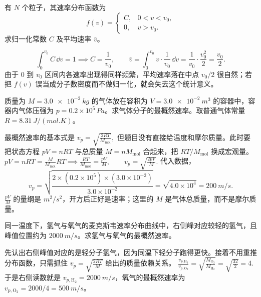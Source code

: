 \documentclass[lang=cn,11pt]{elegantbook}
\begin{document}
\begin{exercise}[分段常数分布函数怎样先归一化再求平均速率]
有 \(N\) 个粒子，其速率分布函数为
\[
f(v)=
\begin{cases}
C,&0<v<v_0,\\
0,&v>v_0.
\end{cases}
\]
求归一化常数 \(C\) 及平均速率 \(\bar v\)。
\end{exercise}
\begin{solution}
\[
\int_0^{v_0}C\,\dd v=1\implies C=\frac1{v_0},\qquad
\bar v=\int_0^{v_0} v\cdot \frac{1}{v_0}\,\dd v
=\frac{1}{v_0}\cdot \frac{v_0^2}{2}
=\frac{v_0}{2}.
\]
由于 \(0\) 到 \(v_0\) 区间内各速率出现得同样频繁，平均速率落在中点 \(v_0/2\) 很自然；若把 \(f(v)\) 误当成分子数密度而不做归一化，就会失去这个统计意义。
\end{solution}


\begin{exercise}
质量为 \(M=\SI{3.0e-2}{kg}\) 的气体放在容积为 \(V=\SI{3.0e-2}{m^3}\) 的容器中，容器内气体压强为 \(p=0.2\times10^5\,\si{Pa}\)。求气体分子的最概然速率。取普通气体常量 \(R=\SI{8.31}{J/(mol.K)}\)。
\end{exercise}

\begin{solution}
最概然速率的基本式是
 \(v_p=\sqrt{\frac{2RT}{M_{\mathrm{mol}}}},\) 
但题目没有直接给温度和摩尔质量。此时要把状态方程 \(pV=nRT\) 与总质量 \(M=nM_{\mathrm{mol}}\) 合起来，把 \(RT/M_{\mathrm{mol}}\) 换成宏观量。
 \(pV=nRT=\frac{M}{M_{\mathrm{mol}}}RT \implies \frac{RT}{M_{\mathrm{mol}}}=\frac{pV}{M},\qquad v_p=\sqrt{\frac{2pV}{M}}.\) 
代入数据，
\[
v_p=\sqrt{\frac{2\times(0.2\times10^5)\times(3.0\times10^{-2})}{3.0\times10^{-2}}}
=\sqrt{4.0\times10^4}
=\SI{200}{m/s}.
\]
\(\frac{pV}{M}\) 的量纲是 \(\si{m^2/s^2}\)，开方后正好是速率；这里的 \(M\) 是气体总质量，而不是摩尔质量。
\end{solution}

\begin{exercise}[从同温氢气和氧气的分布图怎样反推最概然速率]
同一温度下，氢气与氧气的麦克斯韦速率分布曲线中，右侧峰对应较轻的氢气，且峰值位置约为 \(\SI{2000}{m/s}\)。求氢气与氧气的最概然速率。
\end{exercise}

\begin{solution}
先认出右侧峰值对应的是轻分子氢气，因为同温下轻分子跑得更快。接着不用重推分布函数，只需抓住
 \(v_p=\sqrt{\frac{2RT}{M}}\) 
给出的质量依赖关系。
 \(\frac{v_{p,\mathrm{H_2}}}{v_{p,\mathrm{O_2}}} =\sqrt{\frac{M_{\mathrm{O_2}}}{M_{\mathrm{H_2}}}} =\sqrt{\frac{32}{2}}=4.\) 
于是右侧读数就是 \(v_{p,\mathrm{H_2}}=\SI{2000}{m/s}\)，氧气的最概然速率为 \(v_{p,\mathrm{O_2}}=2000/4=\SI{500}{m/s}\)。
\end{solution}
\end{document}
